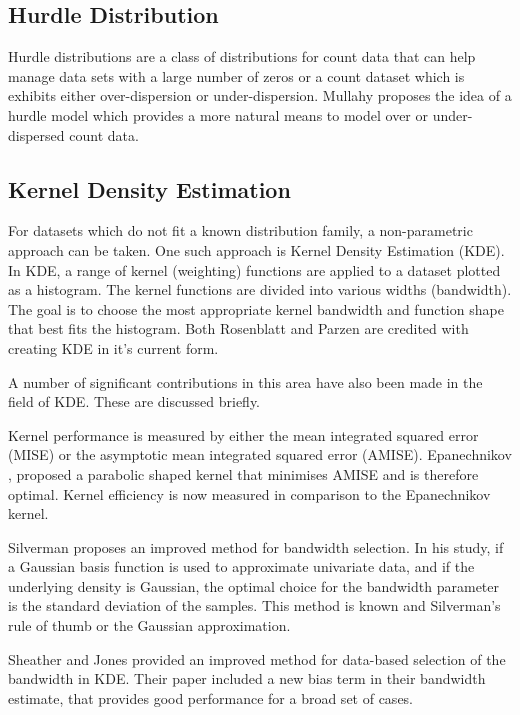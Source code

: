 \documentclass[conference]{IEEEtran}
\begin{document}
\subsection{Hurdle Distribution}

Hurdle distributions are a class of distributions for count data that can help manage data sets with a large number of zeros or a count dataset which is exhibits either over-dispersion or under-dispersion. Mullahy\cite{mullahy1986specification} proposes the idea of a hurdle model which provides a more natural means to model over or under-dispersed count data. 

\subsection{Kernel Density Estimation}

For datasets which do not fit a known distribution family, a non-parametric approach can be taken. One such approach is Kernel Density Estimation (KDE). In KDE, a range of kernel (weighting) functions are applied to a dataset plotted as a histogram. The kernel functions are divided into various widths (bandwidth). The goal is to choose the most appropriate kernel bandwidth and function shape that best fits the histogram. Both Rosenblatt\cite{rosenblatt1956remarks} and Parzen\cite{parzen1962estimation} are credited with creating KDE in it's current form. \par

A number of significant contributions in this area have also been made in the field of KDE. These are discussed briefly.  

Kernel performance is measured by either the mean integrated squared error (MISE) or the asymptotic mean integrated squared error (AMISE). Epanechnikov \cite{epanechnikov1969non}, proposed a parabolic shaped kernel that minimises AMISE and is therefore optimal. Kernel efficiency is now measured in comparison to the Epanechnikov kernel.

Silverman \cite{silverman1986density} proposes an improved method for bandwidth selection. In his study, if a Gaussian basis function is used to approximate univariate data, and if the underlying density is Gaussian, the optimal choice for the bandwidth parameter is the standard deviation of the samples. This method is known and Silverman's rule of thumb or the Gaussian approximation. 

Sheather and Jones\cite{sheather1991reliable} provided an improved method for data-based selection of the bandwidth in KDE. Their paper included a new bias term in their bandwidth estimate, that provides good performance for a broad set of cases.
\end{document}

